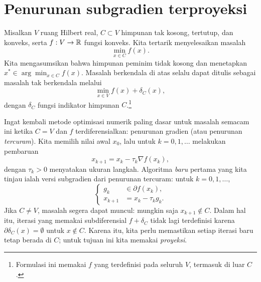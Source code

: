 \chapter{Penurunan subgradien terproyeksi}

Misalkan \(V\) ruang Hilbert real, \(C\subset V\) himpunan tak kosong, tertutup, dan konveks, serta \(f:V\rightarrow\mathbb{R}\) fungsi konveks. Kita tertarik menyelesaikan masalah
\begin{equation}
    \min_{x\in C} f(x).
\end{equation}
Kita mengasumsikan bahwa himpunan peminim tidak kosong dan menetapkan
\(x^*\in\arg\min_{x\in C}f(x)\). Masalah berkendala di atas selalu dapat ditulis sebagai masalah tak berkendala melalui
\begin{equation}
    \min_{x\in V} f(x) + \delta_C(x),
\end{equation}
dengan \(\delta_C\) fungsi indikator himpunan \(C\).\footnote{Formulasi ini memakai \(f\) yang terdefinisi pada seluruh \(V\), termasuk di luar \(C\).}

Ingat kembali metode optimisasi numerik paling dasar untuk masalah semacam ini ketika \(C=V\) dan \(f\) terdiferensialkan: penurunan gradien (atau penurunan \emph{tercuram}). Kita memilih nilai awal \(x_0\), lalu untuk \(k=0,1,\dots\) melakukan pembaruan
\begin{equation}
    x_{k+1} = x_k-\tau_k \nabla f(x_k),
\end{equation}
dengan \(\tau_k>0\) menyatakan ukuran langkah. Algoritma \emph{baru} pertama yang kita tinjau ialah versi subgradien dari penurunan tercuram: untuk \(k=0,1,\dots\),
\begin{equation}
    \begin{cases}
        g_k &\in \partial f(x_k),\\
        x_{k+1} &= x_k-\tau_k g_k.
    \end{cases}
\end{equation}
Jika \(C\neq V\), masalah segera dapat muncul: mungkin saja \(x_{k+1}\notin C\). Dalam hal itu, iterasi yang memakai subdiferensial \(f+\delta_C\) tidak lagi terdefinisi karena \(\partial\delta_C(x)=\emptyset\) untuk \(x\notin C\). Karena itu, kita perlu memastikan setiap iterasi baru tetap berada di \(C\); untuk tujuan ini kita memakai \emph{proyeksi}.

